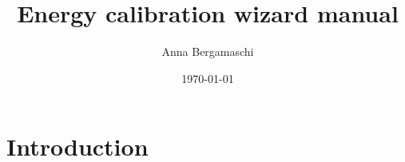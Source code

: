 \documentclass{article}
\begin{document}
\title{Energy calibration wizard manual}
\author{Anna Bergamaschi}
\date{\today}
\maketitle


\section{Introduction}

\end{document}

